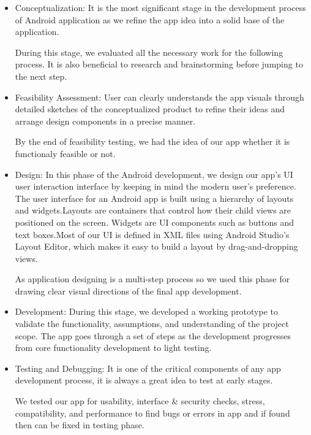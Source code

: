 \begin{itemize}

\item Conceptualization: It is the most significant stage in the development process of Android application as we refine the app idea into a solid base of the application. \par
During this stage, we evaluated all the necessary work for the following process. It is also beneficial to research and brainstorming before jumping to the next step. 

\item Feasibility Assessment: User can clearly understands the app visuals through detailed sketches of the conceptualized product to refine their ideas and arrange design components in a precise manner.\par
By the end of feasibility testing, we had the idea of our app whether it is functionaly feasible or not. 

\item Design: In this phase of the Android development, we design our app's UI user interaction interface by keeping in mind the modern user’s preference. The user interface for an Android app is built using a hierarchy of layouts and widgets.Layouts are containers that control how their child views are positioned on the screen. Widgets are UI components such as buttons and text boxes.Most of our UI is defined in XML files using Android Studio's Layout Editor, which makes it easy to build a layout by drag-and-dropping views.\par 
As application designing is a multi-step process so we used this phase for drawing clear visual directions of the final app development.

\item Development: During this stage, we developed a working prototype to validate the functionality, assumptions, and understanding of the project scope. The app goes through a set of steps as the development progresses from core functionality development to light testing.

\item Testing and Debugging: It is one of the critical components of any app development process, it is always a great idea to test at early stages. \par
We tested our app for usability, interface & security checks, stress, compatibility, and performance to find bugs or errors in app and if found then can be fixed in testing phase. 
\end{itemize}




